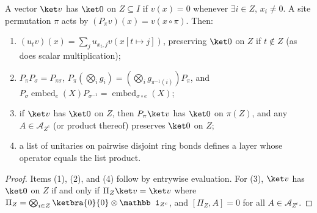 \begin{lemma}
    \label{lem:qc_site_permutations}
    \leanok
    A vector $\ket v$ has $\ket0$ on $Z\subseteq I$ if $v(x)=0$ whenever $\exists i\in Z,\,x_i\neq0$. A site permutation $\pi$ acts by $(P_\pi v)(x)=v(x\circ\pi)$. Then:
    \begin{enumerate}
        \item $(u_t v)(x)=\sum_j u_{x_t,j}v(x[t\mapsto j])$, preserving $\ket0$ on $Z$ if $t\notin Z$ (as does scalar multiplication);
        \item $P_\pi P_\sigma=P_{\pi\sigma}$, $P_\pi(\bigotimes_i g_i)=(\bigotimes_i g_{\pi^{-1}(i)})P_\pi$, and $P_\sigma\operatorname{embed}_e(X)P_{\sigma^{-1}}=\operatorname{embed}_{\sigma\circ e}(X)$;
        \item if $\ket v$ has $\ket0$ on $Z$, then $P_\pi\ket v$ has $\ket0$ on $\pi(Z)$, and any $A\in\mathcal A_{Z^c}$ (or product thereof) preserves $\ket0$ on $Z$;
        \item a list of unitaries on pairwise disjoint ring bonds defines a layer whose operator equals the list product.
    \end{enumerate}
\end{lemma}
\begin{proof}
    \leanok
    Items (1), (2), and (4) follow by entrywise evaluation. For (3), $\ket v$ has $\ket0$ on $Z$ if and only if $\Pi_Z\ket v=\ket v$ where $\Pi_Z=\bigotimes_{i\in Z}\ketbra{0}{0}\otimes\mathbb 1_{Z^c}$, and $[\Pi_Z,A]=0$ for all $A\in\mathcal A_{Z^c}$.
\end{proof}

